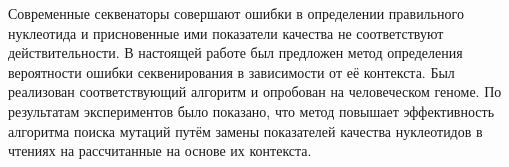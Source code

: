 \startconclusionpage

Современные секвенаторы совершают ошибки в определении правильного нуклеотида и присновенные ими показатели качества не соответствуют действительности. В настоящей работе был предложен метод определения вероятности ошибки секвенирования в зависимости от её контекста. Был реализован соответствующий алгоритм и опробован на человеческом геноме. По результатам экспериментов было показано, что метод повышает эффективность алгоритма поиска мутаций путём замены показателей качества нуклеотидов в чтениях на рассчитанные на основе их контекста.
